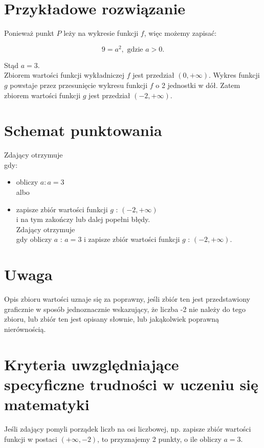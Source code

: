 \documentclass[10pt]{article}
\begin{document}
\section*{Przykładowe rozwiązanie}
Ponieważ punkt $P$ leży na wykresie funkcji $f$, więc możemy zapisać:

$$
9=a^{2}, \text { gdzie } a>0 .
$$

Stąd $a=3$.\\
Zbiorem wartości funkcji wykładniczej $f$ jest przedział $(0,+\infty)$. Wykres funkcji $g$ powstaje przez przesunięcie wykresu funkcji $f$ o 2 jednostki w dół. Zatem zbiorem wartości funkcji $g$ jest przedział $(-2,+\infty)$.

\section*{Schemat punktowania}
Zdający otrzymuje\\
gdy:

\begin{itemize}
  \item obliczy $a: a=3$\\
albo
  \item zapisze zbiór wartości funkcji $g$ : $(-2,+\infty)$\\
i na tym zakończy lub dalej popełni błędy.\\
Zdający otrzymuje\\
gdy obliczy $a$ : $a=3$ i zapisze zbiór wartości funkcji $g$ : $(-2,+\infty)$.
\end{itemize}

\section*{Uwaga}
Opis zbioru wartości uznaje się za poprawny, jeśli zbiór ten jest przedstawiony graficznie w sposób jednoznacznie wskazujący, że liczba -2 nie należy do tego zbioru, lub zbiór ten jest opisany słownie, lub jakąkolwiek poprawną nierównością.

\section*{Kryteria uwzględniające specyficzne trudności w uczeniu się matematyki}
Jeśli zdający pomyli porządek liczb na osi liczbowej, np. zapisze zbiór wartości funkcji w postaci $(+\infty,-2)$, to przyznajemy 2 punkty, o ile obliczy $a=3$.
\end{document}
